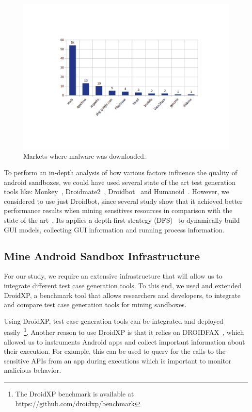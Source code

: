 \begin{figure}[ht]
\centering
\includegraphics[scale=0.3]{images/stores.pdf}
\caption{Markets where malware was downloaded.}
 \label{fig:stores}
\end{figure}

To perform an in-depth analysis of how various factors influence the quality of android sandboxes, we could have used several state of the art test generation tools like: Monkey~\cite{Monkey}, Droidmate2~\cite{DBLP:conf/kbse/BorgesHZ18}, Droidbot~\cite{DBLP:conf/icse/LiYGC17} and Humanoid~\cite{DBLP:conf/kbse/LiY0C19}. However, we considered to use just Droidbot, since several study show that it achieved better performance results when mining sensitives resources in comparison with the state of the art~\cite{DBLP:conf/wcre/BaoLL18,DBLP:journals/jss/CostaMMSSBNR22}. Its applies a depth-first strategy (DFS)~\cite{DBLP:conf/oopsla/AzimN13} to dynamically build GUI models, collecting GUI information and running process
information.

\subsection{Mine Android Sandbox Infrastructure}\label{sec:infra}

For our study, we require an extensive infrastructure that will allow us to integrate different test case generation tools. To this end, we used and extended DroidXP\cite{DBLP:conf/scam/CostaMCMVBC20}, a benchmark tool that allows researchers and developers, to integrate and compare test case generation tools for mining sandboxes.

Using DroidXP, test case generation tools can be integrated and deployed easily~\footnote{The DroidXP benchmark is available at https://github.com/droidxp/benchmark}. Another reason to use DroidXP is that it relies on DROIDFAX~\cite{cai2016understanding}, which allowed us to instruments Android apps and collect important information about their execution. For example, this can be used to query for the calls to the sensitive APIs from an app during executions which is important to monitor malicious behavior. 

